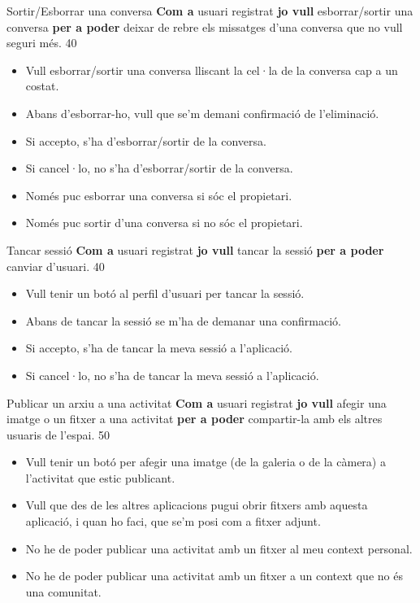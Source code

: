 \pintaHistoria
    {Sortir/Esborrar una conversa}
    {\textbf{Com a} usuari registrat \textbf{jo vull} esborrar/sortir una conversa \textbf{per a poder} deixar de rebre els missatges d'una conversa que no vull seguri més.}
    {40} 
    {
    \begin{itemize}[leftmargin=0.3cm]
        \item Vull esborrar/sortir una conversa lliscant la cel·la de la conversa cap a un costat.
        \item Abans d'esborrar-ho, vull que se'm demani confirmació de l'eliminació.
        \item Si accepto, s'ha d'esborrar/sortir de la conversa.
        \item Si cancel·lo, no s'ha d'esborrar/sortir de la conversa.
        \item Només puc esborrar una conversa si sóc el propietari.
        \item Només puc sortir d'una conversa si no sóc el propietari.
    \end{itemize}
    }

\pintaHistoria
    {Tancar sessió}
    {\textbf{Com a} usuari registrat \textbf{jo vull} tancar la sessió \textbf{per a poder} canviar d'usuari.}
    {40} 
    {
    \begin{itemize}[leftmargin=0.3cm]
        \item Vull tenir un botó al perfil d'usuari per tancar la sessió.
        \item Abans de tancar la sessió se m'ha de demanar una confirmació.
        \item Si accepto, s'ha de tancar la meva sessió a l'aplicació.
        \item Si cancel·lo, no s'ha de tancar la meva sessió a l'aplicació.
    \end{itemize}
    }
    
\pintaHistoria
    {Publicar un arxiu a una activitat}
    {\textbf{Com a} usuari registrat \textbf{jo vull} afegir una imatge o un fitxer a una activitat \textbf{per a poder} compartir-la amb els altres usuaris de l'espai.}
    {50}
    {
    \begin{itemize}[leftmargin=0.3cm]
        \item Vull tenir un botó per afegir una imatge (de la galeria o de la càmera) a l'activitat que estic publicant.
        \item Vull que des de les altres aplicacions pugui obrir fitxers amb aquesta aplicació, i quan ho faci, que se'm posi com a fitxer adjunt.
        \item No he de poder publicar una activitat amb un fitxer al meu context personal.
        \item No he de poder publicar una activitat amb un fitxer a un context que no és una comunitat.
    \end{itemize}
    }
    
